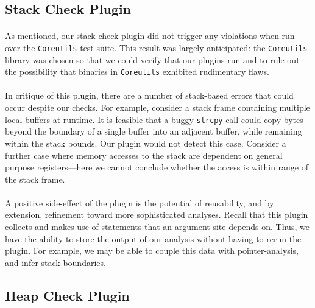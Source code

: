 \documentclass[letterpaper,11pt]{article}
\begin{document}
\subsection{Stack Check Plugin}

\paragraph{}
As mentioned, our stack check plugin did not trigger any violations when run
over the \texttt{Coreutils} test suite. This result was largely anticipated:
the \texttt{Coreutils} library was chosen so that we could verify that our
plugins run and to rule out the possibility that binaries in \texttt{Coreutils}
exhibited rudimentary flaws.

\paragraph{}
In critique of this plugin, there are a number of stack-based errors that could
occur despite our checks. For example, consider a stack frame containing
multiple local buffers at runtime. It is feasible that a buggy \texttt{strcpy}
call could copy bytes beyond the boundary of a single buffer into an adjacent
buffer, while remaining within the stack bounds. Our plugin would not detect
this case. Consider a further case where memory accesses to the stack
are dependent on general purpose registers---here we cannot conclude
whether the access is within range of the stack frame.

\paragraph{}
A positive side-effect of the plugin is the potential of reusability, and by
extension, refinement toward more sophisticated analyses. Recall that this
plugin collects and makes use of statements that an argument site depends on.
Thus, we have the ability to store the output of our analysis without having to
rerun the plugin. For example, we may be able to couple this data with
pointer-analysis, and infer stack boundaries.

\subsection{Heap Check Plugin}
\end{document}
